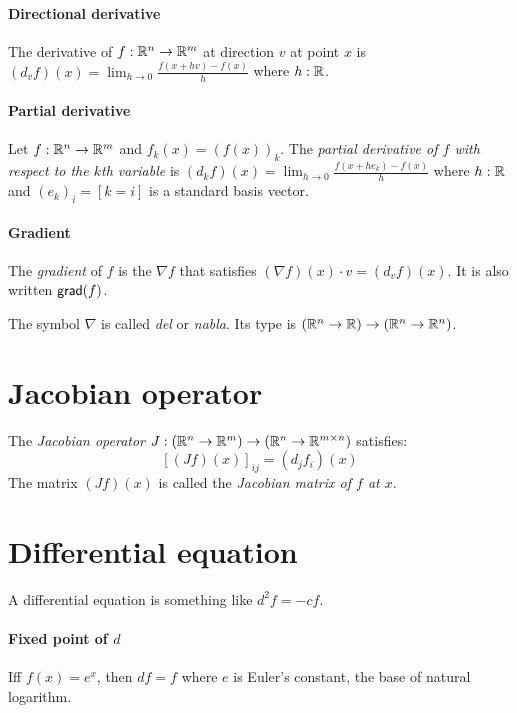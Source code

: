%
%
\paragraph{Directional derivative}
The derivative of \(f : \mathbb{R}^n \to \mathbb{R}^m\) at direction \(v\) at point \(x\) is
\((d_v f)(x) = \lim_{h\to 0}\frac{f(x+h v)-f(x)}{h}\)
where \(h : \mathbb{R}\).

\paragraph{Partial derivative}
Let \(f : \mathbb{R}^n \to \mathbb{R}^m\) and
\(f_k(x) = (f(x))_k\).
The
%
\emph{partial derivative of \(f\) with respect to the \(k\)th variable} is
\((d_k f)(x) = \lim_{h\to 0}\frac{f(x+he_k)-f(x)}{h}\)
where \(h : \mathbb{R}\) and
\((e_k)_i = [k = i]\) is a standard basis vector.

%
\paragraph{Gradient}
The \emph{gradient} of \(f\) is the \(\nabla f\)
that satisfies \((\nabla f)(x) \cdot v = (d_v f)(x)\).
It is also written \(\textsf{grad}(f)\).

The symbol \(\nabla\) is called \emph{del} or \emph{nabla}.
Its type is \((\mathbb{R}^n \to \mathbb{R}) \to (\mathbb{R}^n \to \mathbb{R}^n)\).

\section{Jacobian operator}

The
%
\emph{Jacobian operator} \(J : (\mathbb{R}^n \to \mathbb{R}^m) \to (\mathbb{R}^n \to \mathbb{R}^{m \times n})\)
satisfies:
\[
    [(Jf)(x)]_{ij} = (d_j f_i)(x)
\]
The matrix \((Jf)(x)\) is called the
%
\emph{Jacobian matrix of \(f\) at \(x\)}.

\section{Differential equation}

%
A differential equation is something like \(d^2f = -cf\).

\paragraph{Fixed point of \(d\)}
%
Iff \(f(x) = e^x\), then \(df = f\)
where \(e\) is Euler's constant, the base of natural logarithm.
